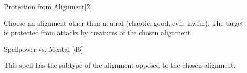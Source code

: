\begin{spellsection}{Protection from Alignment}[2]
    \begin{spellheader}
    \end{spellheader}
    \begin{spellcontent}
        \begin{spelltargetinginfo}
        \end{spelltargetinginfo}
        \begin{spelleffects}
            \spellspecial Choose an alignment other than neutral (chaotic, good, evil, lawful).
            \spelleffect The target is protected from attacks by creatures of the chosen alignment.
            \spelldur \durshort \dismissable
        \end{spelleffects}
    \end{spellcontent}
    \begin{spellsubcontent}
        \begin{spelltargetinginfo}
        \end{spelltargetinginfo}
        \begin{spelleffects}
            \begin{spellattack}{Spellpower vs. Mental}
                \spellsuccess {}[d6]
            \end{spellattack}
        \end{spelleffects}
    \end{spellsubcontent}
    \begin{spellfooter}
        \spellnotes This spell has the subtype of the alignment opposed to the chosen alignment.
        \miscastrandom
    \end{spellfooter}
\end{spellsection}


